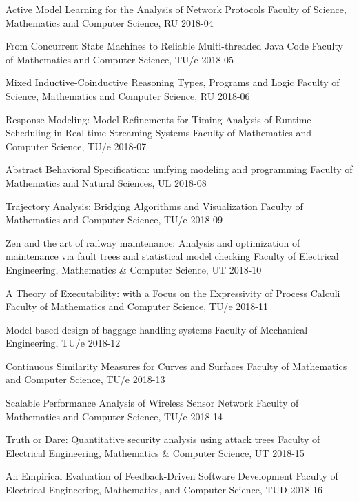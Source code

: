 \begin{multicols}{2}
         {Active Model Learning for the Analysis of Network Protocols}
         {Faculty of Science, Mathematics and Computer Science, RU}
         {2018-04}

         {From Concurrent State Machines to Reliable Multi-threaded Java Code}
         {Faculty of Mathematics and Computer Science, TU/e}
         {2018-05}

         {Mixed Inductive-Coinductive Reasoning Types, Programs and Logic}
         {Faculty of Science, Mathematics and Computer Science, RU}
         {2018-06}

         {Response Modeling: Model Refinements for Timing Analysis of Runtime Scheduling in Real-time Streaming Systems}
         {Faculty of Mathematics and Computer Science, TU/e}
         {2018-07}

         {Abstract Behavioral Specification: unifying modeling and programming}
         {Faculty of Mathematics and Natural Sciences, UL}
         {2018-08}
         
         {Trajectory Analysis: Bridging Algorithms and Visualization}
         {Faculty of Mathematics and Computer Science, TU/e}
         {2018-09}

         {Zen and the art of railway maintenance: Analysis and optimization of maintenance via fault trees and statistical model checking}
         {Faculty of Electrical Engineering, Mathematics \& Computer Science, UT}
         {2018-10}

         {A Theory of Executability: with a Focus on the Expressivity of Process Calculi}
         {Faculty of Mathematics and Computer Science, TU/e}
         {2018-11}

         {Model-based design of baggage handling systems}
         {Faculty of Mechanical Engineering, TU/e}
         {2018-12}
		 
         {Continuous Similarity Measures for Curves and Surfaces}
         {Faculty of Mathematics and Computer Science, TU/e}
         {2018-13}
		 
         {Scalable Performance Analysis of Wireless Sensor Network}
         {Faculty of Mathematics and Computer Science, TU/e}
         {2018-14}

         {Truth or Dare: Quantitative security analysis using attack trees}
         {Faculty of Electrical Engineering, Mathematics \& Computer Science, UT}
         {2018-15}

         {An Empirical Evaluation of Feedback-Driven Software Development}
         {Faculty of Electrical Engineering, Mathematics, and Computer Science, TUD}
         {2018-16}
		
\end{multicols}
